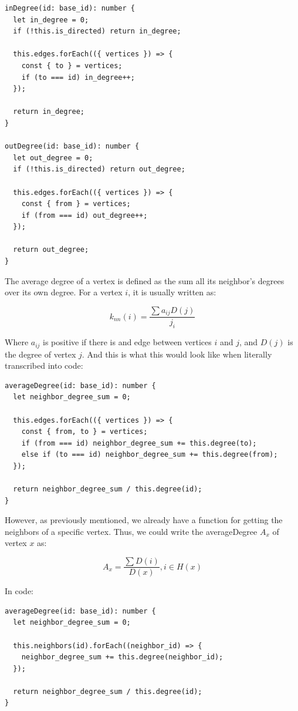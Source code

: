 \begin{verbatim}
inDegree(id: base_id): number {
  let in_degree = 0;
  if (!this.is_directed) return in_degree;

  this.edges.forEach(({ vertices }) => {
    const { to } = vertices;
    if (to === id) in_degree++;
  });

  return in_degree;
}

outDegree(id: base_id): number {
  let out_degree = 0;
  if (!this.is_directed) return out_degree;

  this.edges.forEach(({ vertices }) => {
    const { from } = vertices;
    if (from === id) out_degree++;
  });

  return out_degree;
}
\end{verbatim}

The average degree of a vertex is defined as the sum all its neighbor's degrees over its own degree.
For a vertex $i$, it is usually written as:

$$k_{nn}(i)=\frac{\sum{a_{ij}D(j)}}{j_i}$$

Where $a_{ij}$ is positive if there is and edge between vertices $i$ and $j$,
and $D(j)$ is the degree of vertex $j$.
And this is what this would look like when literally transcribed into code:

\begin{verbatim}
averageDegree(id: base_id): number {
  let neighbor_degree_sum = 0;

  this.edges.forEach(({ vertices }) => {
    const { from, to } = vertices;
    if (from === id) neighbor_degree_sum += this.degree(to);
    else if (to === id) neighbor_degree_sum += this.degree(from);
  });

  return neighbor_degree_sum / this.degree(id);
}
\end{verbatim}

However, as previously mentioned, we already have a function for getting the neighbors of
a specific vertex.
Thus, we could write the averageDegree $A_x$ of vertex $x$ as:

$$A_x=\frac{\sum{D(i)}}{D(x)}, i\in H(x)$$

In code:

\begin{verbatim}
averageDegree(id: base_id): number {
  let neighbor_degree_sum = 0;

  this.neighbors(id).forEach((neighbor_id) => {
    neighbor_degree_sum += this.degree(neighbor_id);
  });

  return neighbor_degree_sum / this.degree(id);
}
\end{verbatim}

